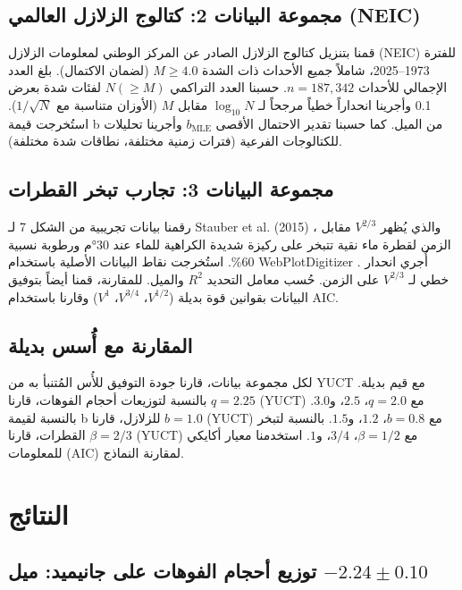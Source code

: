 \documentclass[11pt,a4paper]{article}
\begin{document}
	\subsection{مجموعة البيانات 2: كتالوج الزلازل العالمي (NEIC)}
	
	قمنا بتنزيل كتالوج الزلازل الصادر عن المركز الوطني لمعلومات الزلازل (NEIC) \cite{USGSNEIC} للفترة 1973–2025، شاملاً جميع الأحداث ذات الشدة \(M \ge 4.0\) (لضمان الاكتمال). بلغ العدد الإجمالي للأحداث \(n = 187,342\). حسبنا العدد التراكمي \(N(\ge M)\) لفئات شدة بعرض 0.1 وأجرينا انحداراً خطياً مرجحاً لـ \(\log_{10} N\) مقابل \(M\) (الأوزان متناسبة مع \(1/\sqrt{N}\)). استُخرجت قيمة b من الميل. كما حسبنا تقدير الاحتمال الأقصى \(b_{\text{MLE}}\) \cite{Aki1965} وأجرينا تحليلات للكتالوجات الفرعية (فترات زمنية مختلفة، نطاقات شدة مختلفة).
	
	\subsection{مجموعة البيانات 3: تجارب تبخر القطرات}
	
	رقمنا بيانات تجريبية من الشكل 7 لـ Stauber et al. (2015) \cite{Stauber2015}، والذي يُظهر \(V^{2/3}\) مقابل الزمن لقطرة ماء نقية تتبخر على ركيزة شديدة الكراهية للماء عند 30°م ورطوبة نسبية 60\%. استُخرجت نقاط البيانات الأصلية باستخدام WebPlotDigitizer \cite{WebPlotDigitizer}. أُجري انحدار خطي لـ \(V^{2/3}\) على الزمن. حُسب معامل التحديد \(R^2\) والميل. للمقارنة، قمنا أيضاً بتوفيق البيانات بقوانين قوة بديلة (\(V^{1/2}\)، \(V^{3/4}\)، \(V^{1}\)) وقارنا باستخدام AIC.
	
	\subsection{المقارنة مع أُسس بديلة}
	
	لكل مجموعة بيانات، قارنا جودة التوفيق للأُس المُتنبأ به من YUCT مع قيم بديلة. بالنسبة لتوزيعات أحجام الفوهات، قارنا \(q = 2.25\) (YUCT) مع \(q = 2.0\)، \(2.5\)، و\(3.0\). بالنسبة لقيمة b للزلازل، قارنا \(b = 1.0\) (YUCT) مع \(b = 0.8\)، \(1.2\)، و\(1.5\). بالنسبة لتبخر القطرات، قارنا \(\beta = 2/3\) (YUCT) مع \(\beta = 1/2\)، \(3/4\)، و\(1\). استخدمنا معيار أكايكي للمعلومات (AIC) لمقارنة النماذج.
	
	\section{النتائج}
	
	\subsection{توزيع أحجام الفوهات على جانيميد: ميل \(-2.24 \pm 0.10\)}
	
\end{document}
